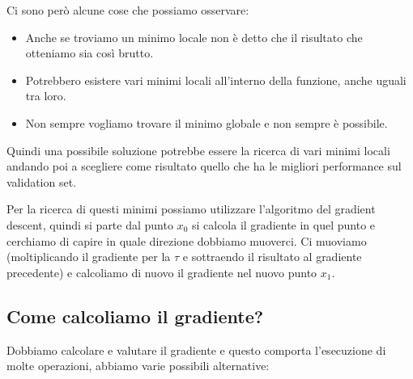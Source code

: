 \documentclass[14pt]{extreport}
\begin{document}
Ci sono però alcune cose che possiamo osservare:
\begin{itemize}
	\item Anche se troviamo un minimo locale non è detto che il risultato che otteniamo sia così brutto.
	\item Potrebbero esistere vari minimi locali all'interno della funzione, anche uguali tra loro.
	\item Non sempre vogliamo trovare il minimo globale e non sempre è possibile.
\end{itemize}

Quindi una possibile soluzione potrebbe essere la ricerca di vari minimi locali andando poi a scegliere come risultato quello che ha le migliori
performance sul validation set.

Per la ricerca di questi minimi possiamo utilizzare l'algoritmo del gradient descent, quindi si parte dal punto $x_0$ si calcola il gradiente in quel
punto e cerchiamo di capire in quale direzione dobbiamo muoverci. Ci muoviamo (moltiplicando il gradiente per la $\tau$ e sottraendo il risultato al
gradiente precedente) e calcoliamo di nuovo il gradiente nel nuovo punto $x_1$.

\subsection{Come calcoliamo il gradiente?}

Dobbiamo calcolare e valutare il gradiente e questo comporta l'esecuzione di molte operazioni, abbiamo varie possibili alternative:
\end{document}

